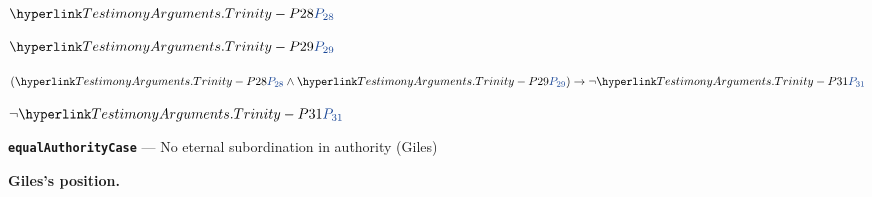 \documentclass[11pt,paper=\testimonypaper,DIV=13,parskip=false]{scrartcl}
\begin{document}
\begin{derivation}
  \item[(1)] \(\pvar{TestimonyArguments.Trinity}{28}\)
  \item[(2)] \(\pvar{TestimonyArguments.Trinity}{29}\)
  \item[(3)] \((\pvar{TestimonyArguments.Trinity}{28} \land \pvar{TestimonyArguments.Trinity}{29}) \rightarrow \lnot \pvar{TestimonyArguments.Trinity}{31}\)
  \item[\(\vdash\)] \(\lnot \pvar{TestimonyArguments.Trinity}{31}\)
\end{derivation}
\par\medskip\noindent\textbf{\texttt{equal\allowbreak{}Authority\allowbreak{}Case}} --- No eternal subordination in authority (Giles)\par\nobreak\noindent
\textbf{Giles’s position.}
\end{document}
